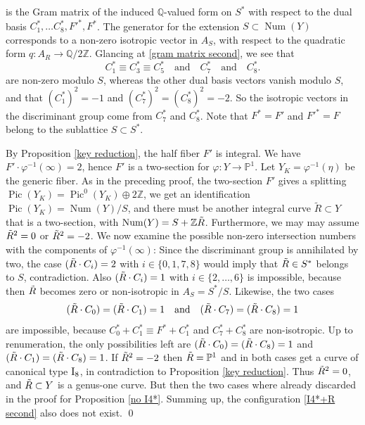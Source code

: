 \documentclass[oneside, 12pt]{amsart}
\theoremstyle{definition}
\theoremstyle{remark}
\newcommand{\ZZ}{\mathbb{Z}}
\newcommand{\QQ}{\mathbb{Q}}
\newcommand{\PP}{\mathbb{P}}
\newcommand{\I}{\text{\rm I}}
\newcommand{\Num}{\operatorname{Num}}
\newcommand{\Pic}{\operatorname{Pic}}
\newcommand{\quadand}{\quad\text{and}\quad}
\newcommand{\ra}{\rightarrow}
\newcommand{\inv}{{-1}}
\begin{document}
is the Gram matrix of the induced $\QQ$-valued form on $S^*$ with respect to the dual basis $C_1^*,\ldots C_8^*,F'^*, F^*$.
The generator for the extension $S\subset\Num(Y)$   corresponds  to a non-zero isotropic vector in $A_S$, with
respect to the quadratic form $q:A_R\ra\QQ/2\ZZ$.  
Glancing at \eqref{gram matrix second}, we see that 
$$
C_1^*\equiv C_3^*\equiv C_5^*\quadand C_7^*\quadand C_8^*. 
$$
are non-zero modulo $S$,     whereas the other dual basis vectors vanish modulo  $S$, and that
$(C_1^*)^2=-1$ and $(C_7^*)^2=(C_8^*)^2=-2$. So the isotropic vectors in the discriminant group come from $C_7^*$ and $C_8^*$.
Note that   $F^*=F'$ and $F'^*=F$ belong to the sublattice $S\subset S^*$.

By Proposition \ref{key reduction}, the half fiber  $F'$ is   integral. 
We have $F'\cdot \varphi^\inv(\infty) =2$, hence $F'$ is a two-section for  $\varphi:Y\ra\PP^1$.
Let  $Y_K=\varphi^{-1}(\eta)$ be the generic fiber.
As in the preceding proof, the two-section $F'$ gives a splitting $\Pic(Y_K)=\Pic^0(Y_K)\oplus 2\ZZ$,
we get an identification $\Pic(Y_K)=\Num(Y)/S$,
and there must be another integral curve $\tilde{R}\subset Y$ that is a two-section, 
with $\Num(Y)=S+\ZZ\tR$. Furthermore, we may may assume $\tilde{R}^2=0$ or $\tilde{R}^2=-2$.
We now examine the possible non-zero intersection numbers with the components of $\varphi^\inv(\infty)$:
Since the discriminant group is annihilated by two, 
the case $(\tilde{R}\cdot C_i)=2$ with $i\in \{0,1,7,8\}$ would imply that $\tilde{R}\in S^*$ belongs to $S$, contradiction.
Also $(\tilde{R}\cdot C_i)=1$ with $i\in \{2,\ldots,6\}$ is impossible, because then $\tilde{R}$ becomes zero or non-isotropic in $A_S=S^*/S$. 
Likewise, the two cases 
$$
 (\tR\cdot C_0) = (\tR\cdot C_1) =1\quadand  (\tR\cdot C_7)=(\tR\cdot C_8)=1
$$
are impossible, because $C_0^*+C_1^*\equiv F^*+C_1^*$ and $C_7^*+C_8^*$ are non-isotropic.
Up to renumeration, the only  possibilities  left are $(\tilde{R}\cdot C_0) = (\tilde{R}\cdot C_8)=1$ and $(\tilde{R}\cdot C_1) = (\tilde{R}\cdot C_8)=1$.
If $\tilde{R}^2=-2$ then $\tR=\PP^1$ and in both cases get  a curve of canonical type $\I_8$, in contradiction to Proposition \ref{key reduction}.
Thus $\tilde{R}^2=0$, and $\tilde{R}\subset Y$ is a genus-one curve.  But then the two cases where already discarded in the proof for Proposition \ref{no I4*}.
Summing up, the configuration \eqref{I4*+R second} also does not exist.
\qed
\end{document}
